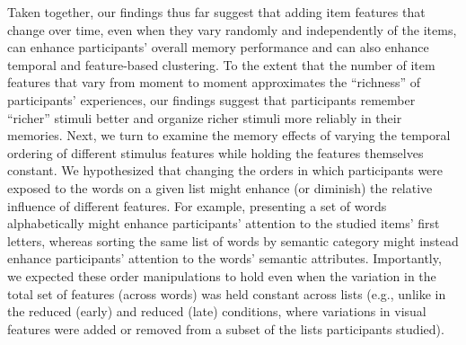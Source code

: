 \documentclass[11pt]{article}
\begin{document}
Taken together, our findings thus far suggest that adding item features that
change over time, even when they vary randomly and independently of the items,
can enhance participants' overall memory performance and can also enhance
temporal and feature-based clustering. To the extent that the number of item
features that vary from moment to moment approximates the ``richness'' of
participants' experiences, our findings suggest that participants remember
``richer'' stimuli better and organize richer stimuli more reliably in their
memories. Next, we turn to examine the memory effects of varying the temporal
ordering of different stimulus features while holding the features themselves
constant. We hypothesized that changing the orders in which participants were
exposed to the words on a given list might enhance (or diminish) the relative
influence of different features. For example, presenting a set of words
alphabetically might enhance participants' attention to the studied items'
first letters, whereas sorting the same list of words by semantic category
might instead enhance participants' attention to the words' semantic
attributes. Importantly, we expected these order manipulations to hold even
when the variation in the total set of features (across words) was held
constant across lists (e.g., unlike in the reduced (early) and reduced (late)
conditions, where variations in visual features were added or removed from a
subset of the lists participants studied).
\end{document}
